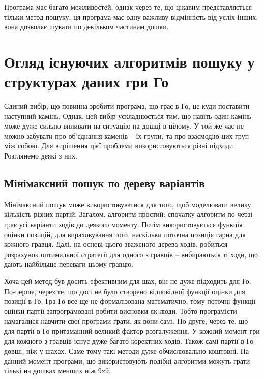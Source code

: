 Програма має багато можливостей, однак через те, що цікавим представляється тільки метод пошуку, ця програма має одну важливу відмінність від усліх інших: вона дозволяє шукати по декільком частинам дошки.
\section{Огляд існуючих алгоритмів пошуку у структурах даних гри Го}
Єдиний вибір, що повинна зробити програма, що грає в Го, це куди поставити наступний камінь. Однак, цей вибір ускладнюється тим, що навіть один камінь може дуже сильно впливати на ситуацію на дошці в цілому. У той же час не можно забувати про об'єднання каменів -- їх групи, та про взаємодію цих груп між собою. Для вирішення цієї проблеми використовуються різні підходи. Розглянемо деякі з них.

\subsection{Мінімаксний пошук по дереву варіантів}
Мінімаксний пошук може використовуватися для того, щоб моделювати велику кількість різних партій. Загалом, алгоритм простий: спочатку алгоритм по черзі грає усі варіанти ходів до деякого моменту. Потім використовується функція оцінки позицій, для вираховування того, наскільки поточна позиція гарна для кожного гравця. Далі, на основі цього зваженого дерева ходів, робиться розрахунок оптимальної стратегії для одного з гравців -- вибираються ті ходи, що дають найбільше переваги цьому гравцю.

Хоча цей метод був досить ефективним для шах, він не дуже підходить для Го. По-перше, через те, що досі не було створено відповідної функції оцінки для позиції в Го. Гра Го все ще не формалізована математично, тому поточні функції оцінки партії запрограмовані робити висновки як люди. Тобто програмісти намагалися навчити свої програми грати, як вони самі. По-друге, через те, що для партії в Го притаманний великий фактор розгалуження. У кожний момент гри для кожного з гравців існує дуже багато коректних ходів. Також самі партії в Го довші, ніж у шахах. Саме тому такі методи дуже обчислювально коштовні. На данний момент програми, що використовують подібні алгоритми можуть грати тількі на дошках менших ніж 9x9.

